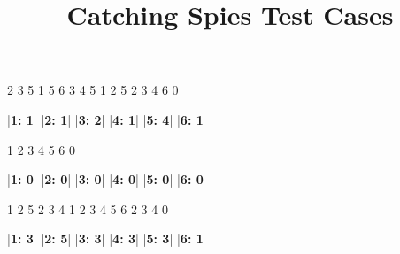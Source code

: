 \documentclass{../../codeproblem}
\begin{document}
\title{Catching Spies Test Cases}

\begin{minipage}[t]{.33\linewidth}
\begin{example}
2 3 5
1 5 6
3 4 5
1 2 5
2 3 4 6
0

|\textbf{1: 1}|
|\textbf{2: 1}|
|\textbf{3: 2}|
|\textbf{4: 1}|
|\textbf{5: 4}|
|\textbf{6: 1}\end{example}
\end{minipage}
\begin{minipage}[t]{.33\linewidth}
\begin{example}
1 2
3 4
5 6
0

|\textbf{1: 0}|
|\textbf{2: 0}|
|\textbf{3: 0}|
|\textbf{4: 0}|
|\textbf{5: 0}|
|\textbf{6: 0}\end{example}
\end{minipage}
\begin{minipage}[t]{.33\linewidth}
\begin{example}
1 2 5
2 3 4
1 2 3 4 5 6
2 3 4
0

|\textbf{1: 3}|
|\textbf{2: 5}|
|\textbf{3: 3}|
|\textbf{4: 3}|
|\textbf{5: 3}|
|\textbf{6: 1}\end{example}
\end{minipage}
\end{document}
